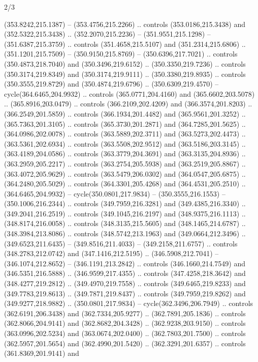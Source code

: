 \begin{flagdescription}{2/3}
\begin{scope}[xshift=0.5\flaglength,yshift=0.5\flagwidth,scale=\flagwidth/495.65]
\begin{scope}[y=0.8pt, x=0.8pt, yscale=-1,shift={(-463.76,-309.78)}]
  (353.8242,215.1387) -- (353.4756,215.2266) .. controls (353.0186,215.3438) and
  (352.5322,215.3438) .. (352.2070,215.2236) -- (351.9551,215.1298) --
  (351.6387,215.3759) .. controls (351.4658,215.5107) and (351.2314,215.6806) ..
  (351.1201,215.7509) -- (350.9150,215.8769) -- (350.6396,217.7021) .. controls
  (350.4873,218.7040) and (350.3496,219.6152) .. (350.3350,219.7236) .. controls
  (350.3174,219.8349) and (350.3174,219.9111) .. (350.3380,219.8935) .. controls
  (350.3555,219.8729) and (350.4874,219.6796) .. (350.6309,219.4570) --
  cycle(364.6465,204.9932) .. controls (365.0771,204.4160) and
  (365.6602,203.5078) .. (365.8916,203.0479) .. controls (366.2109,202.4209) and
  (366.3574,201.8203) .. (366.2549,201.5859) .. controls (366.1934,201.4482) and
  (365.9561,201.3252) .. (365.7363,201.3105) .. controls (365.3730,201.2871) and
  (364.7285,201.5625) .. (364.0986,202.0078) .. controls (363.5889,202.3711) and
  (363.5273,202.4473) .. (363.5361,202.6934) .. controls (363.5508,202.9512) and
  (363.5186,203.3145) .. (363.4189,204.0586) .. controls (363.3779,204.3691) and
  (363.3135,204.8936) .. (363.2959,205.2217) .. controls (363.2754,205.5938) and
  (363.2519,205.8867) .. (363.4072,205.9629) .. controls (363.5479,206.0302) and
  (364.0547,205.6875) .. (364.2480,205.5029) .. controls (364.3301,205.4268) and
  (364.4531,205.2510) .. (364.6465,204.9932) -- cycle(350.0801,217.9834) --
  (350.3555,216.1553) -- (350.1006,216.2344) .. controls (349.7959,216.3281) and
  (349.4385,216.3340) .. (349.2041,216.2519) .. controls (349.1045,216.2197) and
  (348.9375,216.1113) .. (348.8174,216.0058) .. controls (348.3135,215.5605) and
  (348.1465,214.6787) .. (348.3984,213.8086) .. controls (348.5742,213.1963) and
  (349.0664,212.3496) .. (349.6523,211.6435) -- (349.8516,211.4033) --
  (349.2158,211.6757) .. controls (348.2783,212.0742) and (347.1416,212.5195) ..
  (346.5908,212.7041) -- (346.1074,212.8652) -- (346.1191,213.2842) .. controls
  (346.1660,214.7549) and (346.5351,216.5888) .. (346.9599,217.4355) .. controls
  (347.4258,218.3642) and (348.4277,219.2812) .. (349.4970,219.7558) .. controls
  (349.6465,219.8233) and (349.7783,219.8613) .. (349.7871,219.8437) .. controls
  (349.7959,219.8262) and (349.9277,218.9882) .. (350.0801,217.9834) --
  cycle(362.3496,206.7949) .. controls (362.6191,206.3438) and
  (362.7334,205.9277) .. (362.7891,205.1836) .. controls (362.8066,204.9141) and
  (362.8682,204.3428) .. (362.9238,203.9150) .. controls (363.0996,202.5234) and
  (363.0674,202.0400) .. (362.7803,201.7500) .. controls (362.5957,201.5654) and
  (362.4990,201.5420) .. (362.3291,201.6357) .. controls (361.8369,201.9141) and

\end{scope}
\end{scope}
\end{flagdescription}
